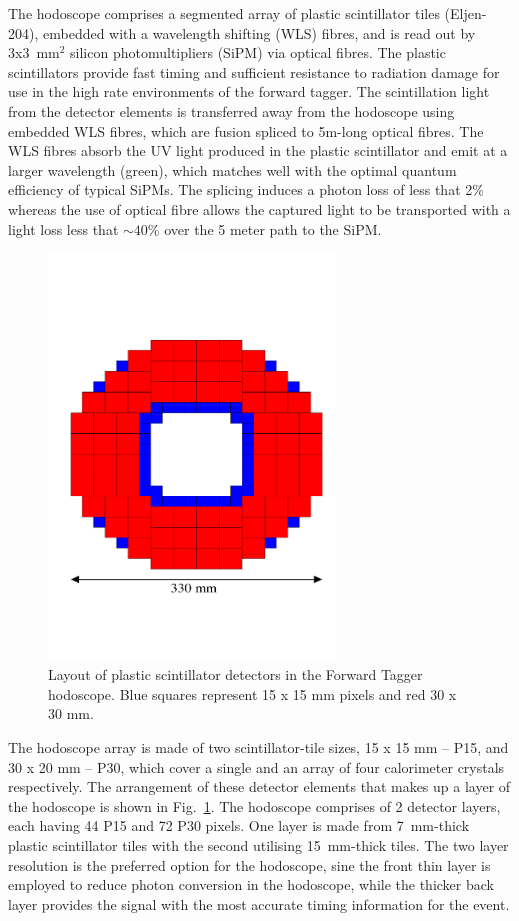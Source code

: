 \documentclass[12pt]{article}
\begin{document}
The hodoscope comprises a segmented array of plastic scintillator tiles (Eljen-204), embedded with a wavelength shifting (WLS) fibres, and is read out by 3x3~mm$^2$ silicon photomultipliers (SiPM) via optical fibres. The plastic scintillators provide fast timing and sufficient resistance to radiation damage for use in the high rate environments of the forward tagger. The scintillation light from the detector elements is transferred away from the hodoscope using embedded WLS fibres, which are fusion spliced to 5m-long optical fibres. The WLS fibres absorb the UV light produced in the plastic scintillator and emit at a larger wavelength (green), which matches well with the optimal quantum efficiency of typical SiPMs. The splicing induces a photon loss of less that 2\% whereas the use of optical fibre allows the captured light to be transported with a light loss less that $\sim40\%$ over the 5 meter path to the SiPM. 
\begin{figure}[h!]
   \begin{center}
   \includegraphics[width=3.0in]{HodoscopeArrayElement.pdf} 
   \caption{ Layout of plastic scintillator detectors in the Forward Tagger hodoscope. Blue squares represent 15 x 15 mm pixels and red 30 x 30 mm. }      \label{Fig:HodoscopeArrayElement}
   \end{center}
\end{figure}

The hodoscope array is made of two scintillator-tile sizes, 15 x 15 mm -- P15, and 30 x 20 mm -- P30, which cover a single and an array of four calorimeter crystals respectively. The arrangement of these detector elements that makes up a layer of the hodoscope is shown in Fig.~\ref{Fig:HodoscopeArrayElement}. The hodoscope comprises of 2 detector layers, each having 44 P15 and 72 P30 pixels. One layer is made from 7~mm-thick plastic scintillator tiles with the second utilising 15~mm-thick tiles. The two layer resolution is the preferred option for the hodoscope, sine the front thin layer is employed to reduce photon conversion in the hodoscope, while the thicker back layer provides the signal with the most accurate timing information for the event. 
\end{document}
